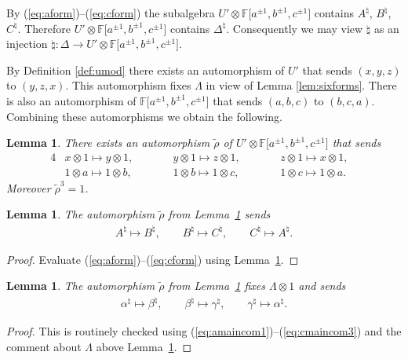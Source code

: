 \documentclass[pdftex]{sigma}
\numberwithin{equation}{section}
\newtheorem{Lemma}[Theorem]{Lemma}
\begin{document}
By (\ref{eq:aform})--(\ref{eq:cform})
the subalgebra
$U'\otimes
\mathbb F \lbrack a^{\pm 1}, b^{\pm 1}, c^{\pm 1}\rbrack $
contains $A^\natural$, $B^\natural$, $C^\natural$.
Therefore
$U'\otimes
\mathbb F \lbrack a^{\pm 1}, b^{\pm 1}, c^{\pm 1}\rbrack $
contains  $\Delta^\natural$.
 Consequently we may view
$\natural $ as an injection
$\natural: \Delta \to
U'\otimes
\mathbb F \lbrack a^{\pm 1}, b^{\pm 1}, c^{\pm 1}\rbrack $.


By Def\/inition
\ref{def:umod} there exists an automorphism of
$U'$
that sends
$(x,y,z)$ to
$(y,z,x)$.
This automorphism f\/ixes $\Lambda$ in view of
Lemma
\ref{lem:sixforms}.
There is also an automorphism of
$\mathbb F \lbrack a^{\pm 1}, b^{\pm 1}, c^{\pm 1}\rbrack $
that sends
 $(a,b,c)$ to $(b,c,a)$.
Combining these automorphisms we obtain the following.

\begin{Lemma}
\label{lem:rhodef}
There exists an automorphism $\tilde \rho$ of
$U' \otimes
\mathbb F \lbrack a^{\pm 1}, b^{\pm 1}, c^{\pm 1}\rbrack $
that sends
\begin{alignat*}{4}
&
x \otimes 1 \mapsto y\otimes 1,
\qquad &&
y \otimes 1 \mapsto z\otimes 1,
\qquad &&
z \otimes 1 \mapsto x\otimes 1,&
\\
&
1 \otimes a \mapsto 1\otimes b,
\qquad &&
1 \otimes b \mapsto 1\otimes c,
\qquad &&
1 \otimes c\mapsto 1\otimes a. &
\end{alignat*}
Moreover $\tilde \rho^3=1$.
\end{Lemma}

\begin{Lemma}
\label{lem:rhomove}
The automorphism $\tilde \rho$ from Lemma~{\rm \ref{lem:rhodef}} sends
\begin{gather*}
A^\natural \mapsto B^\natural,
\qquad
B^\natural \mapsto C^\natural,
\qquad
C^\natural \mapsto A^\natural.
\end{gather*}
\end{Lemma}
\begin{proof}
Evaluate
(\ref{eq:aform})--(\ref{eq:cform})
using
Lem\-ma~\ref{lem:rhodef}.
\end{proof}



\begin{Lemma}
The automorphism $\tilde \rho$ from Lemma~{\rm \ref{lem:rhodef}} fixes $\Lambda \otimes 1$ and sends
\begin{gather*}
\alpha^\natural \mapsto \beta^\natural,
\qquad
\beta^\natural \mapsto \gamma^\natural,
\qquad
\gamma^\natural \mapsto \alpha^\natural.
\end{gather*}
\end{Lemma}
\begin{proof}
This is routinely checked using
(\ref{eq:amaincom1})--(\ref{eq:cmaincom3})
and the comment about $\Lambda $ above
Lem\-ma~\ref{lem:rhodef}.
\end{proof}
\end{document}
